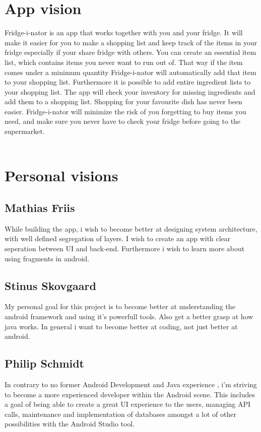 \documentclass[12pt]{article}
\begin{document}
\section{App vision}
Fridge-i-nator is an app that works together with you and your fridge. It will make it easier for you to make a shopping
list and keep track of the items in your fridge especially if your share fridge with others. You can create an essential
item list, which contains items you never want to run out of. That way if the item comes under a minimum quantity Fridge-i-nator
will automatically add that item to your shopping list. Furthermore it is possible to add entire ingredient lists to your shopping list. The app will check your inventory for missing ingredients and add them to a shopping list. Shopping for your favourite dish has never been easier.
Fridge-i-nator will minimize the risk of you forgetting to buy items you need, and make sure you never have to check your fridge before going to the supermarket.
\\
\\

\section{Personal visions}

\subsection{Mathias Friis}
While building the app, i wish to become better at designing system architecture, with well defined segregation of layers. I wish to create an app with clear seperation between UI and back-end.
Furthermore i wish to learn more about using fragments in android.

\subsection{Stinus Skovgaard}
My personal goal for this project is to become better at understanding the android framework and using it's powerfull tools. Also get a better grasp at how java works. In general i want to become better at coding, not just better at android.

\subsection{Philip Schmidt}
In contrary to no former Android Development and Java experience , i'm striving to become a more experienced developer within the Android scene.
This includes a goal of being able to create a great UI experience to the users, managing API calls, maintenance and implementation of databases amongst a lot of other possibilities with the Android Studio tool.
\end{document}
